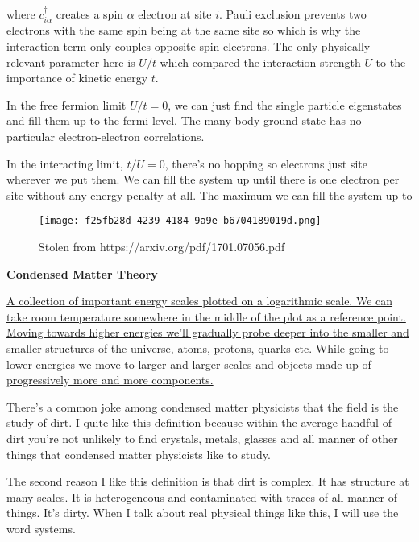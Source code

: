 where \(c^\dagger_{i\alpha}\) creates a spin \(\alpha\) electron at site \(i\). Pauli exclusion prevents two electrons with the same spin being at the same site so which is why the interaction term only couples opposite spin electrons. The only physically relevant parameter here is \(U/t\) which compared the interaction strength \(U\) to the importance of kinetic energy \(t\).

In the free fermion limit \(U/t = 0\), we can just find the single particle eigenstates and fill them up to the fermi level. The many body ground state has no particular electron-electron correlations.

In the interacting limit, \(t/U = 0\), there's no hopping so electrons just site wherever we put them. We can fill the system up until there is one electron per site without any energy penalty at all. The maximum we can fill the system up to

\begin{fignos:no-prefix-figure-caption}

\begin{figure}
\centering
\texttt{[image: f25fb28d-4239-4184-9a9e-b6704189019d.png]}
\caption{Stolen from https://arxiv.org/pdf/1701.07056.pdf}
\end{figure}

\end{fignos:no-prefix-figure-caption}

\textbf{Condensed Matter Theory}

\href{energy_scales}{A collection of important energy scales plotted on a logarithmic scale. We can take room temperature somewhere in the middle of the plot as a reference point. Moving towards higher energies we'll gradually probe deeper into the smaller and smaller structures of the universe, atoms, protons, quarks etc. While going to lower energies we move to larger and larger scales and objects made up of progressively more and more components.}

There's a common joke among condensed matter physicists that the field is the study of dirt. I quite like this definition because within the average handful of dirt you're not unlikely to find crystals, metals, glasses and all manner of other things that condensed matter physicists like to study.

The second reason I like this definition is that dirt is complex. It has structure at many scales. It is heterogeneous and contaminated with traces of all manner of things. It's dirty. When I talk about real physical things like this, I will use the word systems.


